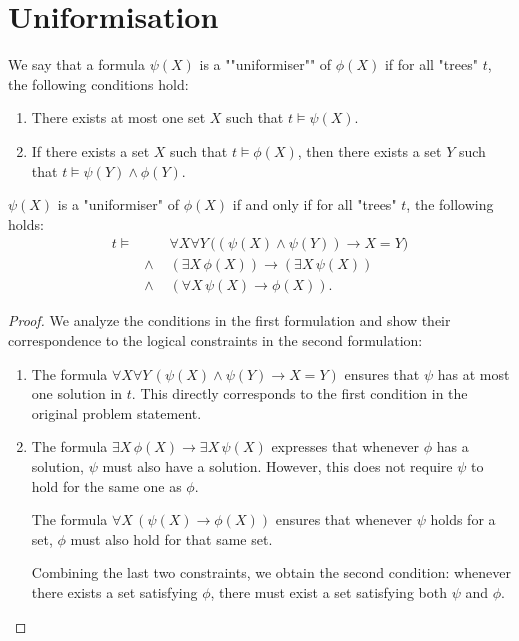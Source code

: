 \documentclass{article}
\begin{document}
\section{Uniformisation}

\begin{definition}[Uniformiser]
	We say that a formula $\psi(X)$ is a ""uniformiser"" of $\phi(X)$ if for all "trees" $t$, the following conditions hold:
	\begin{enumerate}
		\item There exists at most one set $X$ such that $t \models \psi(X)$.
		\item If there exists a set $X$ such that $t \models \phi(X)$, then there exists a set $Y$ such that $t \models \psi(Y) \land \phi(Y)$.
	\end{enumerate}
\end{definition}

\begin{lemma}
	$\psi(X)$ is a "uniformiser" of $\phi(X)$ if and only if for all "trees" $t$, the following holds:
	\begin{eqnarray*}
		t \models &\quad &  \forall X \forall Y \, \Big((\psi(X) \land \psi(Y)) \rightarrow X = Y\Big) \\
		& \land & (\exists X \, \phi(X)) \rightarrow (\exists X \, \psi(X)) \\
		& \land& (\forall X \, \psi(X) \rightarrow \phi(X)).
	\end{eqnarray*}
\end{lemma}

\begin{proof}
	We analyze the conditions in the first formulation and show their correspondence to the logical constraints in the second formulation:

	\begin{enumerate}
		\item The formula $\forall X \forall Y \, (\psi(X) \land \psi(Y) \rightarrow X = Y)$ ensures that $\psi$ has at most one solution
		      in $t$. This directly corresponds to the first condition in the original problem statement.

		\item The formula $\exists X \, \phi(X) \rightarrow \exists X \, \psi(X)$ expresses that whenever $\phi$ has a solution, $\psi$ must also have a solution.
		      However, this does not require $\psi$ to hold for the same one as $\phi$.

		      The formula $\forall X \, (\psi(X) \rightarrow \phi(X))$ ensures that whenever $\psi$ holds for a set, $\phi$ must also hold for that same set.

		      Combining the last two constraints, we obtain the second condition: whenever there exists a set satisfying $\phi$, there must exist a set
		      satisfying both $\psi$ and $\phi$.
	\end{enumerate}
\end{proof}
\end{document}
